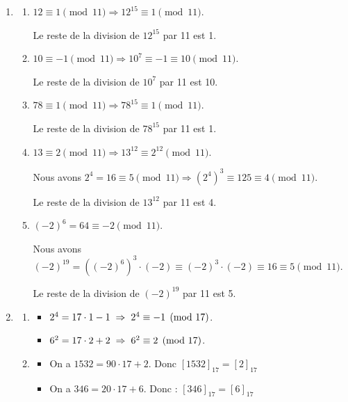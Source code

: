 \begin{enumerate}[label=\thechapter.\arabic*, font=\bfseries, itemsep=7mm,labelsep*=3mm,left=0mm]
\item
\begin{enumerate}[label=\alph*),itemsep=5mm,left=-1mm,labelsep*=2mm]
	\item $12 \equiv 1 \pmod{11} \Rightarrow 12^{15} \equiv 1 \pmod{11}$.
	
	\ev
	Le reste de la division de $12^{15}$ par 11 est 1.
	\item $10 \equiv -1 \pmod{11} \Rightarrow 10^{7} \equiv -1 \equiv 10 \pmod{11}$.
	
	\ev
	Le reste de la division de $10^{7}$ par 11 est 10.
	\item $78 \equiv 1 \pmod{11} \Rightarrow 78^{15} \equiv 1 \pmod{11}$.
	
	\ev
	Le reste de la division de $78^{15}$ par 11 est 1.
	\item $13 \equiv 2 \pmod{11} \Rightarrow 13^{12} \equiv 2^{12} \pmod{11}$.
	
	\ev
	Nous avons $2^4=16 \equiv 5 \pmod{11} \Rightarrow \left(2^4\right)^3 \equiv 125 \equiv 4 \pmod{11}$.
	
	\ev
	Le reste de la division de $13^{12}$ par 11 est 4.
	\item $\left(-2\right)^6 = 64 \equiv -2 \pmod{11}$.
	
	\ev
	Nous avons $\left(-2\right)^{19} = \left(\left(-2\right)^6\right)^3\cdot(-2) \equiv \left(-2\right)^3\cdot(-2) \equiv 16 \equiv 5 \pmod{11}$.
	
	\ev
	Le reste de la division de $\left(-2\right)^{19}$ par 11 est 5.
\end{enumerate}




\item
\begin{enumerate}[label=\alph*),itemsep=5mm,left=-1mm,labelsep*=2mm]
	\item \begin{itemize}\setlength{\itemsep}{2mm}
		\item $2^4=17\cdot 1 -1  \eh{1}\Rightarrow\eh{1} 2^4\equiv -1 \pmod{17}$.
		\item $6^2=17\cdot 2 +2  \eh{1}\Rightarrow\eh{1} 6^2\equiv 2 \pmod{17}$.
	\end{itemize}
	
	\item \begin{itemize}\setlength{\itemsep}{2mm}
		\item On a $1532=90\cdot 17 +2$. Donc $[1532]_{17}=[2]_{17}$
		\item On a $346=20\cdot 17 +6$. Donc : $[346]_{17}=[6]_{17}$ 
	\end{itemize}
	

\end{enumerate}
\end{enumerate}

